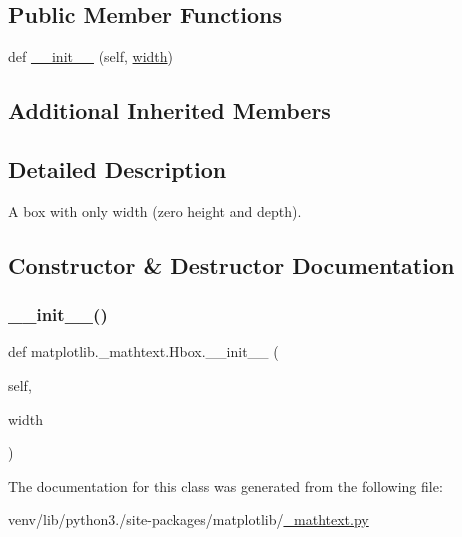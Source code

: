 \subsection*{Public Member Functions}
\begin{DoxyCompactItemize}
\item 
def \hyperlink{classmatplotlib_1_1__mathtext_1_1Hbox_a983747eef4bc17b59b734ba7f22971f4}{\+\_\+\+\_\+init\+\_\+\+\_\+} (self, \hyperlink{classmatplotlib_1_1__mathtext_1_1Box_ae1a5ebb887d52c6e1da379a2265d04cb}{width})
\end{DoxyCompactItemize}
\subsection*{Additional Inherited Members}


\subsection{Detailed Description}
\begin{DoxyVerb}A box with only width (zero height and depth).\end{DoxyVerb}
 

\subsection{Constructor \& Destructor Documentation}
\mbox{\label{classmatplotlib_1_1__mathtext_1_1Hbox_a983747eef4bc17b59b734ba7f22971f4}} 
\subsubsection{\texorpdfstring{\+\_\+\+\_\+init\+\_\+\+\_\+()}{\_\_init\_\_()}}
{\footnotesize\ttfamily def matplotlib.\+\_\+mathtext.\+Hbox.\+\_\+\+\_\+init\+\_\+\+\_\+ (\begin{DoxyParamCaption}\item[{}]{self,  }\item[{}]{width }\end{DoxyParamCaption})}



The documentation for this class was generated from the following file\+:\begin{DoxyCompactItemize}
\item 
venv/lib/python3./site-\/packages/matplotlib/\hyperlink{__mathtext_8py}{\+\_\+mathtext.\+py}\end{DoxyCompactItemize}
